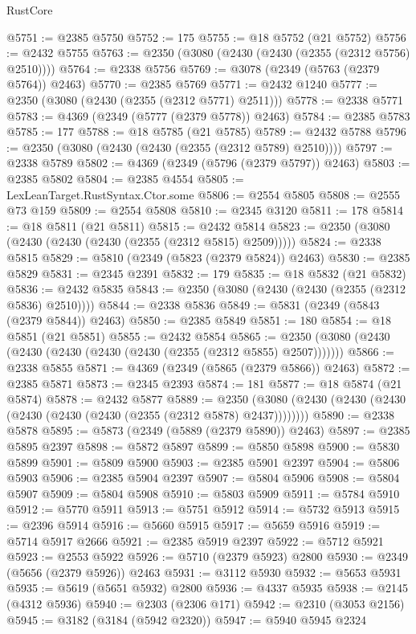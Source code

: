 \begin{lexlean}{RustCore}
\begin{coremodule}
@5751 := @2385 @5750
@5752 := 175
@5755 := @18 @5752 (@21 @5752)
@5756 := @2432 @5755
@5763 := @2350 (@3080 (@2430 (@2430 (@2355 (@2312 @5756) @2510))))
@5764 := @2338 @5756
@5769 := @3078 (@2349 (@5763 (@2379 @5764)) @2463)
@5770 := @2385 @5769
@5771 := @2432 @1240
@5777 := @2350 (@3080 (@2430 (@2355 (@2312 @5771) @2511)))
@5778 := @2338 @5771
@5783 := @4369 (@2349 (@5777 (@2379 @5778)) @2463)
@5784 := @2385 @5783
@5785 := 177
@5788 := @18 @5785 (@21 @5785)
@5789 := @2432 @5788
@5796 := @2350 (@3080 (@2430 (@2430 (@2355 (@2312 @5789) @2510))))
@5797 := @2338 @5789
@5802 := @4369 (@2349 (@5796 (@2379 @5797)) @2463)
@5803 := @2385 @5802
@5804 := @2385 @4554
@5805 := LexLeanTarget.RustSyntax.Ctor.some
@5806 := @2554 @5805
@5808 := @2555 @73 @159
@5809 := @2554 @5808
@5810 := @2345 @3120
@5811 := 178
@5814 := @18 @5811 (@21 @5811)
@5815 := @2432 @5814
@5823 := @2350 (@3080 (@2430 (@2430 (@2430 (@2355 (@2312 @5815) @2509)))))
@5824 := @2338 @5815
@5829 := @5810 (@2349 (@5823 (@2379 @5824)) @2463)
@5830 := @2385 @5829
@5831 := @2345 @2391
@5832 := 179
@5835 := @18 @5832 (@21 @5832)
@5836 := @2432 @5835
@5843 := @2350 (@3080 (@2430 (@2430 (@2355 (@2312 @5836) @2510))))
@5844 := @2338 @5836
@5849 := @5831 (@2349 (@5843 (@2379 @5844)) @2463)
@5850 := @2385 @5849
@5851 := 180
@5854 := @18 @5851 (@21 @5851)
@5855 := @2432 @5854
@5865 := @2350 (@3080 (@2430 (@2430 (@2430 (@2430 (@2430 (@2355 (@2312 @5855) @2507)))))))
@5866 := @2338 @5855
@5871 := @4369 (@2349 (@5865 (@2379 @5866)) @2463)
@5872 := @2385 @5871
@5873 := @2345 @2393
@5874 := 181
@5877 := @18 @5874 (@21 @5874)
@5878 := @2432 @5877
@5889 := @2350 (@3080 (@2430 (@2430 (@2430 (@2430 (@2430 (@2430 (@2355 (@2312 @5878) @2437))))))))
@5890 := @2338 @5878
@5895 := @5873 (@2349 (@5889 (@2379 @5890)) @2463)
@5897 := @2385 @5895 @2397
@5898 := @5872 @5897
@5899 := @5850 @5898
@5900 := @5830 @5899
@5901 := @5809 @5900
@5903 := @2385 @5901 @2397
@5904 := @5806 @5903
@5906 := @2385 @5904 @2397
@5907 := @5804 @5906
@5908 := @5804 @5907
@5909 := @5804 @5908
@5910 := @5803 @5909
@5911 := @5784 @5910
@5912 := @5770 @5911
@5913 := @5751 @5912
@5914 := @5732 @5913
@5915 := @2396 @5914
@5916 := @5660 @5915
@5917 := @5659 @5916
@5919 := @5714 @5917 @2666
@5921 := @2385 @5919 @2397
@5922 := @5712 @5921
@5923 := @2553 @5922
@5926 := @5710 (@2379 @5923) @2800
@5930 := @2349 (@5656 (@2379 @5926)) @2463
@5931 := @3112 @5930
@5932 := @5653 @5931
@5935 := @5619 (@5651 @5932) @2800
@5936 := @4337 @5935
@5938 := @2145 (@4312 @5936)
@5940 := @2303 (@2306 @171)
@5942 := @2310 (@3053 @2156)
@5945 := @3182 (@3184 (@5942 @2320))
@5947 := @5940 @5945 @2324

\end{coremodule}
\end{lexlean}
